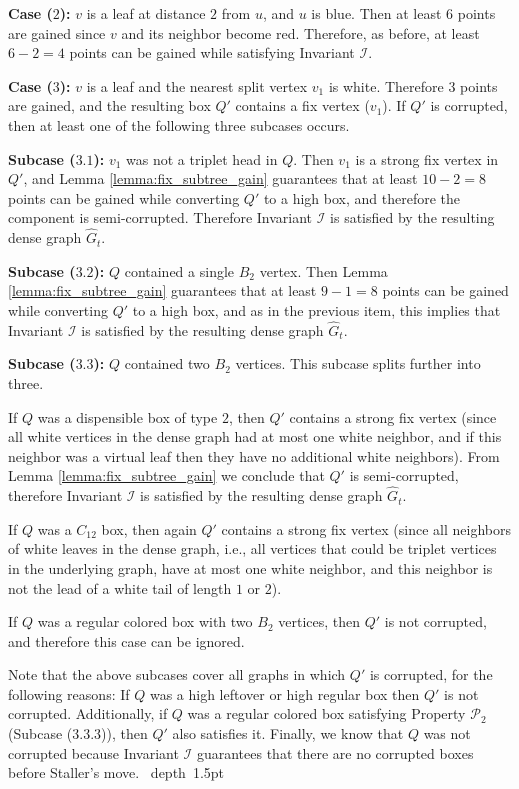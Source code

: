 \documentclass[11pt]{article}
\def\blackslug{\hbox{\hskip 1pt \vrule width 4pt height 8pt
    depth 1.5pt \hskip 1pt}}
\def\QED{\quad\blackslug\lower 8.5pt\null\par}
\def\dnsitem{\vspace{-7pt}\item}
\theoremstyle{definition}
\def\propbbr{\mathcal{P}_2}
\def\invboxes{\mathcal{I}}
\begin{document}
\bigskip
\par\noindent
{\bf Case ($2$):}
$v$ is a leaf at distance $2$ from $u$, and $u$ is blue.
Then at least $6$ points are gained since $v$ and its neighbor become red. Therefore, as before,
at least $6 - 2 = 4$ points can be gained while satisfying Invariant $\invboxes$.

\bigskip
\par\noindent
{\bf Case ($3$):}
$v$ is a leaf and the nearest split vertex $v_1$ is white.
Therefore $3$ points are gained, and the resulting box $Q'$ contains a fix vertex ($v_1$).
If $Q'$ is corrupted, then at least one of the following three subcases occurs.

\smallskip
\par\noindent
{\bf Subcase ($3.1$):}
$v_1$ was not a triplet head in $Q$. Then $v_1$ is a strong fix vertex in $Q'$, and Lemma \ref{lemma:fix_subtree_gain} guarantees that at least $10 - 2 = 8$ 
points can be gained while converting $Q'$ to a high box, and therefore the component is semi-corrupted. Therefore Invariant $\invboxes$ is satisfied by the resulting dense graph $\hat{G}_t$.

\smallskip
\par\noindent
{\bf Subcase ($3.2$):}
$Q$ contained a single $B_2$ vertex. Then Lemma \ref{lemma:fix_subtree_gain} guarantees that at least $9 - 1 = 8$ points can be gained while converting $Q'$ to a high box, and as in the previous item, this implies that Invariant $\invboxes$ is satisfied by the resulting dense graph $\hat{G}_t$.

\smallskip
\par\noindent
{\bf Subcase ($3.3$):}
$Q$ contained two $B_2$ vertices.
This subcase splits further into three.
\begin{description}
	\dnsitem[Subcase ($3.3.1$):] If $Q$ was a dispensible box of type $2$, then $Q'$ contains a strong fix vertex 
	(since all white vertices in the dense graph had at most one white neighbor, and if this neighbor was a virtual leaf then they have no additional white neighbors). 
	From Lemma \ref{lemma:fix_subtree_gain} we conclude that $Q'$ is semi-corrupted, therefore Invariant $\invboxes$ is satisfied by the resulting dense graph $\hat{G}_t$.
	\dnsitem[Subcase ($3.3.2$):] If $Q$ was a $C_{12}$ box, then again $Q'$ contains a strong fix vertex (since all neighbors of white leaves in the dense graph, i.e., all vertices that could be triplet vertices in the underlying graph, have at most one white neighbor, and this neighbor is not the lead of a white tail of length $1$ or $2$). 
	\dnsitem[Subcase ($3.3.3$):]If $Q$ was a regular colored box with two $B_2$ vertices, then $Q'$ is not corrupted, and therefore this case can be ignored.
\end{description}
Note that the above subcases cover all graphs in which $Q'$ is corrupted, for the following reasons:
If $Q$ was a high leftover or high regular box then $Q'$ is not corrupted.
Additionally, if $Q$ was a regular colored box satisfying Property $\propbbr$ (Subcase ($3.3.3$)), then $Q'$ also satisfies it.
Finally, we know that $Q$ was not corrupted because Invariant $\invboxes$ guarantees that there are no corrupted boxes before Staller's move.
\QED
\end{document}
